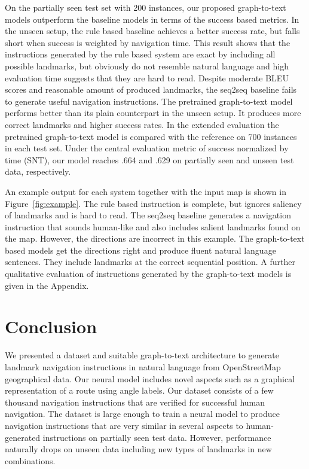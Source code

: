 \documentclass[11pt,a4paper]{article}
\begin{document}
On the partially seen test set with 200 instances, our proposed graph-to-text models outperform the baseline models in terms of the success based metrics. In the unseen setup, the rule based baseline achieves a better success rate, but falls short when success is weighted by navigation time. This result shows that the instructions generated by the rule based system are exact by including all possible landmarks, but obviously do not resemble natural language and high evaluation time suggests that they are hard to read. Despite moderate BLEU scores and reasonable amount of produced landmarks, the seq2seq baseline fails to generate useful navigation instructions. The pretrained graph-to-text model performs better than its plain counterpart in the unseen setup. It produces more correct landmarks and higher success rates. In the extended evaluation the pretrained graph-to-text model is compared with the reference on 700 instances in each test set. Under the central evaluation metric of success normalized by time (SNT), our model reaches .664 and .629 on partially seen and unseen test data, respectively.

An example output for each system together with the input map is shown in Figure~\ref{fig:example}. The rule based instruction is complete, but ignores saliency of landmarks and is hard to read. The seq2seq baseline generates a navigation instruction that sounds human-like and also includes salient landmarks found on the map. However, the directions are incorrect in this example. The graph-to-text based models get the directions right and produce fluent natural language sentences. They include landmarks at the correct sequential position. A further qualitative evaluation of instructions generated by the graph-to-text models is given in the Appendix.



\section{Conclusion}
We presented a dataset and suitable graph-to-text architecture to generate landmark navigation instructions in natural language from OpenStreetMap geographical data. Our neural model includes novel aspects such as a graphical representation of a route using angle labels. Our dataset consists of a few thousand navigation instructions that are verified for successful human navigation. The dataset is large enough to train a neural model to produce navigation instructions that are very similar in several aspects to human-generated instructions on partially seen test data. However, performance naturally drops on unseen data including new types of landmarks in new combinations.
\end{document}
